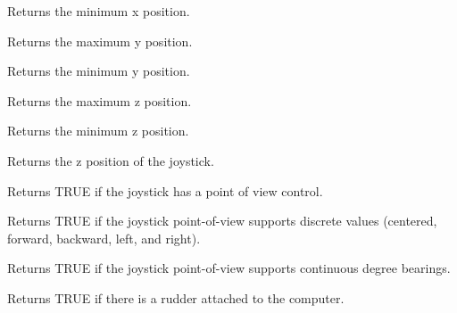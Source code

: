 
Returns the minimum x position.

\label{wxjoystickgetymax}


Returns the maximum y position.

\label{wxjoystickgetymin}


Returns the minimum y position.

\label{wxjoystickgetzmax}


Returns the maximum z position.

\label{wxjoystickgetzmin}


Returns the minimum z position.

\label{wxjoystickgetzposition}


Returns the z position of the joystick.

\label{wxjoystickhaspov}


Returns TRUE if the joystick has a point of view control.

\label{wxjoystickhaspovfdir}


Returns TRUE if the joystick point-of-view supports discrete values (centered, forward, backward, left, and right).

\label{wxjoystickhaspovcts}


Returns TRUE if the joystick point-of-view supports continuous degree bearings.

\label{wxjoystickhasrudder}


Returns TRUE if there is a rudder attached to the computer.

